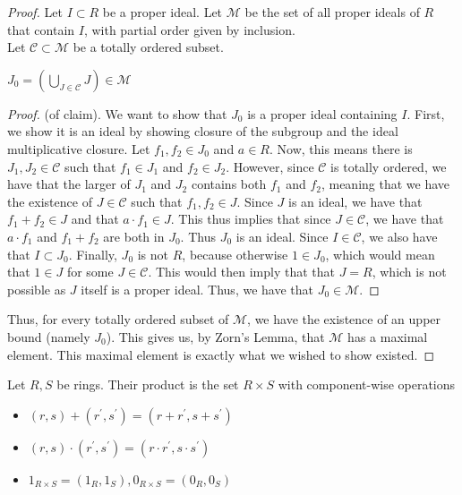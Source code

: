 \begin{proof}
    Let $I \subset R$ be a proper ideal. Let $\mathcal{M}$ be the set of all proper
    ideals of $R$ that contain $I$, with partial order given by inclusion. \\
    Let $\mathcal{C} \subset \mathcal{M}$ be a totally ordered subset.
    \begin{claim}
        $J_0 = \left(\bigcup\limits_{J \in \mathcal{C}}{J}\right) \in \mathcal{M}$
    \end{claim}
    \begin{proof} (of claim). We want to show that $J_0$ is a proper ideal containing
        $I$. First, we show it is an ideal by showing closure of the subgroup and the
        ideal multiplicative closure. Let $f_1, f_2 \in J_0$ and $a \in R$. Now, this means there
        is $J_1, J_2 \in \mathcal{C}$ such that $f_1 \in J_1$ and $f_2 \in J_2$. However,
        since $\mathcal{C}$ is totally ordered, we have that the larger of $J_1$ and $J_2$
        contains both $f_1$ and $f_2$, meaning that we have the existence of $J \in \mathcal{C}$
        such that $f_1,f_2 \in J$. Since $J$ is an ideal, we have that $f_1 + f_2 \in J$ and that
        $a \cdot f_1 \in J$. This thus implies that since $J \in \mathcal{C}$, we have that
        $a \cdot f_1$ and $f_1 + f_2$ are both in $J_0$. Thus $J_0$ is an ideal. Since $I \in \mathcal{C}$,
        we also have that $I \subset J_0$. Finally, $J_0$ is not $R$, because otherwise $1 \in J_0$,
        which would mean that $1 \in J$ for some $J \in \mathcal{C}$. This would then imply that
        that $J = R$, which is not possible as $J$ itself is a proper ideal. Thus, we have that $J_0 \in \mathcal{M}$.
    \end{proof}
    Thus, for every totally ordered subset of $\mathcal{M}$, we have the existence of an
    upper bound (namely $J_0$). This gives us, by Zorn's Lemma, that $\mathcal{M}$ has
    a maximal element. This maximal element is exactly what we wished to show existed.
\end{proof}
\begin{defn}
Let $R,S$ be rings. Their product is the set $R \times S$ with component-wise
operations
\begin{itemize}
    \item $(r,s) + (r^\prime, s^\prime) = (r + r^\prime, s + s^\prime)$
    \item $(r,s) \cdot  (r^\prime, s^\prime) = (r \cdot r^\prime, s \cdot s^\prime)$
    \item $1_{R \times S} = (1_R, 1_S), 0_{R \times S} = (0_R, 0_S)$
\end{itemize}
\end{defn}
